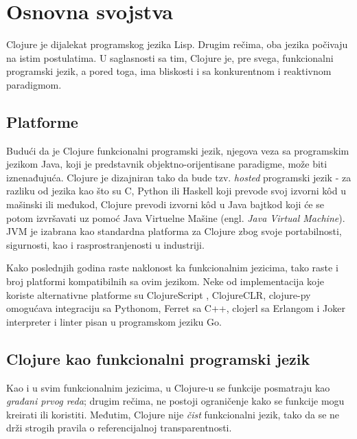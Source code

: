 \section{Osnovna svojstva}
\label{sec:osnovnasvojstva}

Clojure je dijalekat programskog jezika Lisp. Drugim rečima, oba jezika počivaju na istim postulatima. U saglasnosti sa tim, Clojure je, pre svega, funkcionalni programski jezik, a pored toga, ima bliskosti i sa konkurentnom i reaktivnom paradigmom\cite{clojure}.

\subsection{Platforme}
\label{subsec:platforme}

Budući da je Clojure funkcionalni programski jezik, njegova veza sa programskim jezikom Java, koji je predstavnik objektno-orijentisane paradigme, može biti iznenađujuća. Clojure je dizajniran tako da bude tzv. \textit{hosted} programski jezik - za razliku od jezika kao što su C, Python ili Haskell koji prevode svoj izvorni kôd u mašinski ili međukod, Clojure prevodi izvorni kôd u Java bajtkod koji će se potom izvršavati uz pomoć Java Virtuelne Mašine (engl. \textit{Java Virtual Machine}). JVM je izabrana kao standardna platforma za Clojure zbog svoje portabilnosti, sigurnosti, kao i rasprostranjenosti u industriji.


Kako poslednjih godina raste naklonost ka funkcionalnim jezicima, tako raste i broj platformi kompatibilnih sa ovim jezikom. Neke od implementacija koje koriste alternativne platforme su ClojureScript \cite{clojure_script}, ClojureCLR\cite{clojure_clr}, clojure-py\cite{clojure_py} omogućava integraciju sa Pythonom, Ferret\cite{ferret} sa C++, clojerl\cite{clojerl} sa Erlangom i Joker\cite{joker} interpreter i linter pisan u programskom jeziku Go.


\subsection{Clojure kao funkcionalni programski jezik}
\label{subsec:funkcionalni}

Kao i u svim funkcionalnim jezicima, u Clojure-u se funkcije posmatraju kao \emph{građani prvog reda}; drugim rečima, ne postoji ograničenje kako se funkcije mogu kreirati ili koristiti. Međutim, Clojure nije \emph{čist} funkcionalni jezik, tako da se ne drži strogih pravila o referencijalnoj transparentnosti\cite{transparency_2}\cite{transparency}.

